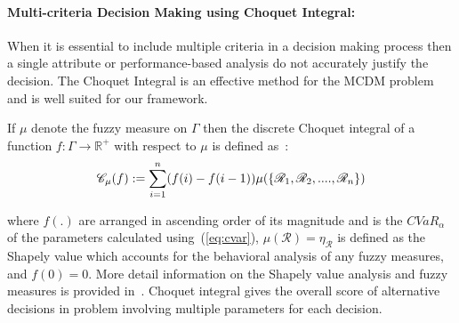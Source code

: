 \paragraph{Multi-criteria Decision Making using Choquet Integral:}
When it is essential to include multiple criteria in a decision making process then a single attribute or performance-based analysis do not accurately justify the decision. The Choquet Integral is an effective method for the MCDM problem~\cite{choquet} and is well suited for our framework.

If $\mu$ denote the fuzzy measure on $\Gamma$ then the discrete Choquet integral of a function $f:\Gamma\rightarrow\mathbb{R}^+$ with respect to $\mu$ is defined as~\cite{choquet}:
\vspace{-3pt}
\begin{equation} \small
    \mathcal{C}_\mu(f) := \sum_{i=1}^{n}(f(i)-f(i-1))\mu(\{\mathcal{R}_1, \mathcal{R}_2, .... , \mathcal{R}_n\})
    \label{eq:choquet}
\end{equation}

\noindent
where $f(.)$ are arranged in ascending order of its magnitude and is the $CVaR_\alpha$ of the parameters calculated using~(\ref{eq:cvar}), $\mu({\mathcal{R}})=\eta_\mathcal{R}$ is defined as the Shapely value which accounts for the behavioral analysis of any fuzzy measures, and $f(0) = 0$. More detail information on the Shapely value analysis and fuzzy measures is provided in~\cite{2006}. Choquet integral gives the overall score of alternative decisions in problem involving multiple parameters for each decision.

